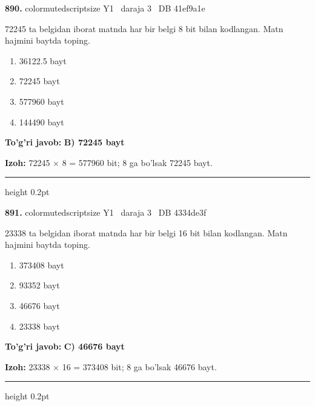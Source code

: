 \documentclass[10pt,a4paper,oneside]{article}
\begin{document}
\noindent\textbf{\color{ink}890.}  {color{muted}scriptsize Y1 \textbullet\ daraja 3 \textbullet\ DB 41ef9a1e}
\par
72245 ta belgidan iborat matnda har bir belgi 8 bit bilan kodlangan. Matn hajmini baytda toping.
\begin{enumerate}[label=\Alph*),leftmargin=9mm]
\item 36122.5 bayt
\item 72245 bayt
\item 577960 bayt
\item 144490 bayt
\end{enumerate}
\begin{tcolorbox}[enhanced,breakable,colback=teal!4,colframe=teal!50!black,boxrule=0.5pt,arc=1.1mm,left=3mm,right=3mm,top=1.7mm,bottom=1.7mm,before skip=2mm,after skip=2mm]
\textbf{\color{teal}To'g'ri javob:} \textbf{B) 72245 bayt}
\par\smallskip
\textbf{Izoh:} 72245 \ensuremath{\times} 8 = 577960 bit; 8 ga bo'lsak 72245 bayt.
\end{tcolorbox}
\vspace{2mm}\hrule height 0.2pt \vspace{3mm}

\noindent\textbf{\color{ink}891.}  {color{muted}scriptsize Y1 \textbullet\ daraja 3 \textbullet\ DB 4334de3f}
\par
23338 ta belgidan iborat matnda har bir belgi 16 bit bilan kodlangan. Matn hajmini baytda toping.
\begin{enumerate}[label=\Alph*),leftmargin=9mm]
\item 373408 bayt
\item 93352 bayt
\item 46676 bayt
\item 23338 bayt
\end{enumerate}
\begin{tcolorbox}[enhanced,breakable,colback=teal!4,colframe=teal!50!black,boxrule=0.5pt,arc=1.1mm,left=3mm,right=3mm,top=1.7mm,bottom=1.7mm,before skip=2mm,after skip=2mm]
\textbf{\color{teal}To'g'ri javob:} \textbf{C) 46676 bayt}
\par\smallskip
\textbf{Izoh:} 23338 \ensuremath{\times} 16 = 373408 bit; 8 ga bo'lsak 46676 bayt.
\end{tcolorbox}
\vspace{2mm}\hrule height 0.2pt \vspace{3mm}
\end{document}
